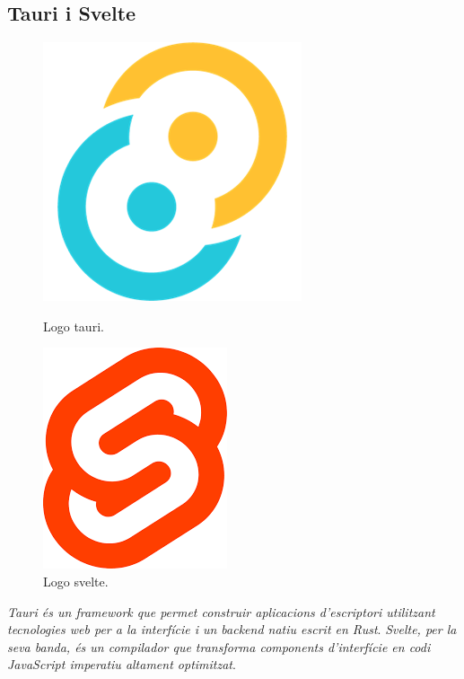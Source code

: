 \subsection{Tauri i Svelte}
\begin{figure}[H]
    \centering
    \begin{minipage}{0.5\textwidth}
        \centering
        \includegraphics[width=0.5\linewidth]{Figures/logos/tauri.png}
        \caption{Logo tauri.}
        \label{fig:react-login-impl}
    \end{minipage}\hfill
    \begin{minipage}{0.5\textwidth}
        \centering
        \includegraphics[width=0.5\linewidth]{Figures/logos/svelte.png}
        \caption{Logo svelte.}
        \label{fig:react-registre-impl}
    \end{minipage}
\end{figure}
\textit{Tauri és un framework que permet construir aplicacions d'escriptori utilitzant tecnologies web per a la interfície i un backend natiu escrit en Rust}. 
\textit{Svelte, per la seva banda, és un compilador que transforma components d'interfície en codi JavaScript imperatiu altament optimitzat}.

